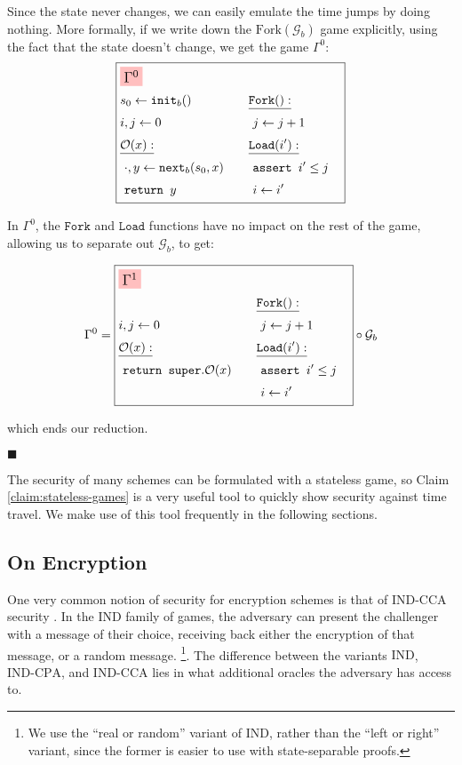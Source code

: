 Since the state never changes, we can easily emulate the time
jumps by doing nothing.
More formally, if we write down the $\text{Fork}(\mathcal{G}_b)$
game explicitly, using the fact that the state doesn't change, we get
the game $\Gamma^0$:
$$
\boxed{
\begin{aligned}
&\colorbox{pink}{\large $\Gamma^0$}\cr
&\begin{aligned}
    &s_0 \gets \texttt{init}_b()\cr
    &i, j \gets 0\cr
    &\underline{\mathcal{O}(x):}\cr
    &\ \cdot, y \gets \texttt{next}_b(s_0, x)\cr
    &\ \texttt{return } y\cr
\end{aligned}
&\begin{aligned}
    &\underline{\texttt{Fork}():}\cr
    &\ j \gets j + 1\cr
    &\underline{\texttt{Load}(i'):}\cr
    &\ \texttt{assert } i' \leq j\cr
    &\ i \gets i'\cr
\end{aligned}\cr
\end{aligned}
}
$$

In $\Gamma^0$, the $\texttt{Fork}$ and $\texttt{Load}$ functions have
no impact on the rest of the game, allowing us to separate out
$\mathcal{G}_b$, to get:

$$
\Gamma^0 = 
\boxed{
\begin{aligned}
&\colorbox{pink}{\large $\Gamma^1$}\cr
&\begin{aligned}
    &i, j \gets 0\cr
    &\underline{\mathcal{O}(x):}\cr
    &\ \texttt{return } \texttt{super}.\mathcal{O}(x)\cr
\end{aligned}
&\begin{aligned}
    &\underline{\texttt{Fork}():}\cr
    &\ j \gets j + 1\cr
    &\underline{\texttt{Load}(i'):}\cr
    &\ \texttt{assert } i' \leq j\cr
    &\ i \gets i'\cr
\end{aligned}\cr
\end{aligned}
} \circ \mathcal{G}_b
$$

which ends our reduction.

$\blacksquare$

The security of many schemes can be formulated with a stateless game,
so Claim \ref{claim:stateless-games} is a very useful tool
to quickly show security against time travel.
We make use of this tool frequently in the following sections.

\subsection{On Encryption}

One very common notion of security for encryption schemes is
that of $\text{IND-CCA}$ security \cite{ny90}.
In the $\text{IND}$ family of games, the adversary can present
the challenger with a message of their choice, receiving
back either the encryption of that message, or a random message.
\footnote{We use the ``real or random'' variant of $\text{IND}$, rather than the ``left or right'' variant, since the former is easier to use with state-separable proofs.}.
The difference between the variants $\text{IND}$, $\text{IND-CPA}$, and $\text{IND-CCA}$
lies in what additional oracles the adversary has access to.

